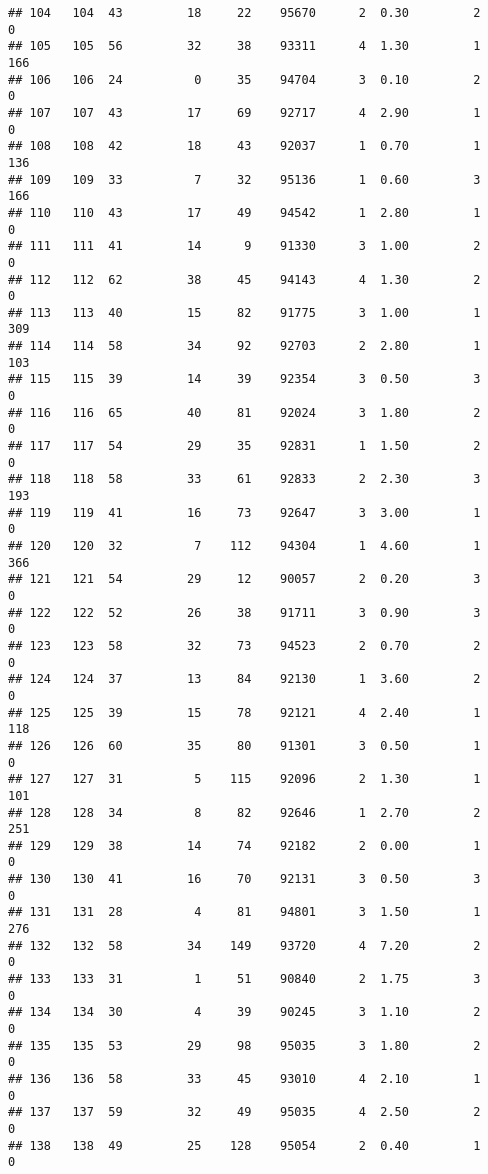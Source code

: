 \documentclass[
]{article}
\begin{document}
\begin{verbatim}
## 104   104  43         18     22    95670      2  0.30         2        0
## 105   105  56         32     38    93311      4  1.30         1      166
## 106   106  24          0     35    94704      3  0.10         2        0
## 107   107  43         17     69    92717      4  2.90         1        0
## 108   108  42         18     43    92037      1  0.70         1      136
## 109   109  33          7     32    95136      1  0.60         3      166
## 110   110  43         17     49    94542      1  2.80         1        0
## 111   111  41         14      9    91330      3  1.00         2        0
## 112   112  62         38     45    94143      4  1.30         2        0
## 113   113  40         15     82    91775      3  1.00         1      309
## 114   114  58         34     92    92703      2  2.80         1      103
## 115   115  39         14     39    92354      3  0.50         3        0
## 116   116  65         40     81    92024      3  1.80         2        0
## 117   117  54         29     35    92831      1  1.50         2        0
## 118   118  58         33     61    92833      2  2.30         3      193
## 119   119  41         16     73    92647      3  3.00         1        0
## 120   120  32          7    112    94304      1  4.60         1      366
## 121   121  54         29     12    90057      2  0.20         3        0
## 122   122  52         26     38    91711      3  0.90         3        0
## 123   123  58         32     73    94523      2  0.70         2        0
## 124   124  37         13     84    92130      1  3.60         2        0
## 125   125  39         15     78    92121      4  2.40         1      118
## 126   126  60         35     80    91301      3  0.50         1        0
## 127   127  31          5    115    92096      2  1.30         1      101
## 128   128  34          8     82    92646      1  2.70         2      251
## 129   129  38         14     74    92182      2  0.00         1        0
## 130   130  41         16     70    92131      3  0.50         3        0
## 131   131  28          4     81    94801      3  1.50         1      276
## 132   132  58         34    149    93720      4  7.20         2        0
## 133   133  31          1     51    90840      2  1.75         3        0
## 134   134  30          4     39    90245      3  1.10         2        0
## 135   135  53         29     98    95035      3  1.80         2        0
## 136   136  58         33     45    93010      4  2.10         1        0
## 137   137  59         32     49    95035      4  2.50         2        0
## 138   138  49         25    128    95054      2  0.40         1        0

\end{verbatim}
\end{document}
